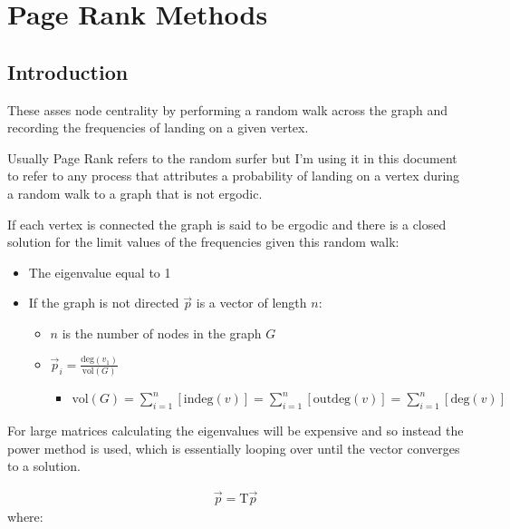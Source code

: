 \documentclass[11pt]{article}
\begin{document}
\section{Page Rank Methods}
\label{sec:orgfe0eea9}
\subsection{Introduction}
\label{sec:org7ab24bb}
These asses node centrality by performing a random walk across the graph and recording the frequencies of landing on a given vertex.

Usually Page Rank refers to the random surfer but I'm using it in this document to refer to any process that attributes a probability of landing on a vertex during a random walk to a graph that is not ergodic.

If each vertex is connected the graph is said to be ergodic and there is a closed solution for the limit values of the frequencies given this random walk:

\begin{itemize}
\item The eigenvalue equal to 1
\item If the graph is not directed \(\vec{p}\) is a vector of length \(n\):
\begin{itemize}
\item \(n\) is the number of nodes in the graph \(G\)
\item \(\vec{p}_{i} = \frac{\mathrm{deg}(v_{1})}{\mathrm{vol}(G)}\)
\begin{itemize}
\item \(\mathrm{vol}(G) = \sum^{n}_{i = 1} \left[ \mathrm{indeg}(v) \right] = \sum^{n}_{i = 1} \left[ \mathrm{outdeg}(v) \right ] = \sum^{n}_{i = 1} \left[ \mathrm{deg}(v) \right]\)
\end{itemize}
\end{itemize}
\end{itemize}


For large matrices calculating the eigenvalues will be expensive and so instead the power method is used, which is essentially looping over until the vector converges to a solution.

\begin{align}
\vec{p} = \mathrm{T}\vec{p} \label{eq:pageRank-Method}
\end{align}
where:
\end{document}
